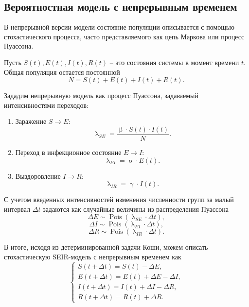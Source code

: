 \documentclass[a4paper, 14pt]{extreport}
\numberwithin{equation}{section}
\renewcommand{\beta}{\upbeta}
\renewcommand{\gamma}{\upgamma}
\renewcommand{\sigma}{\upsigma}
\renewcommand{\lambda}{\uplambda}
\newcommand{\Pois}{\operatorname{Pois}}
\begin{document}
	\subsection{Вероятностная модель с непрерывным временем}
	В непрерывной версии модели состояние популяции описывается с помощью стохастического процесса, часто представляемого как цепь Маркова или процесс Пуассона.
	
	Пусть $S(t), E(t), I(t), R(t)$ -- это состояния системы в момент времени $t$. Общая популяция остается постоянной
	$$N = S(t) + E(t) + I(t) + R(t).$$
	
	Зададим непрерывную модель как процесс Пуассона, задаваемый интенсивностями переходов:
	\begin{enumerate}
		\item Заражение $S \to E$:
		$$\lambda_{SE} = \dfrac{\beta \cdot S(t) \cdot I(t)}{N}.$$
		\item Переход в инфекционное состояние $E \to I$:
		$$\lambda_{EI} = \sigma \cdot E(t).$$
		\item Выздоровление $I \to R$:
		$$\lambda _{IR} = \gamma \cdot I(t).$$
	\end{enumerate}
	
	С учетом введенных интенсивностей изменения численности групп за малый интервал $\Delta t$ задаются как случайные величины из распределения Пуассона
	$$\Delta E \sim \Pois(\lambda_{SE} \cdot \Delta t),$$
	$$\Delta I \sim \Pois(\lambda_{EI} \cdot \Delta t),$$
	$$\Delta R \sim \Pois(\lambda_{IR} \cdot \Delta t).$$
	
	В итоге, исходя из детерминированной задачи Коши, можем описать стохастическую SEIR-модель с непрерывным временем как
	\begin{equation}
		\begin{cases}
			S(t+\Delta t) = S(t) - \Delta E,\\
			E(t+\Delta t) = E(t) + \Delta E - \Delta I,\\
			I(t + \Delta t) = I(t) + \Delta I - \Delta R,\\
			R(t + \Delta t) = R(t) + \Delta R.
		\end{cases}
	\end{equation}
	\newpage
\end{document}
